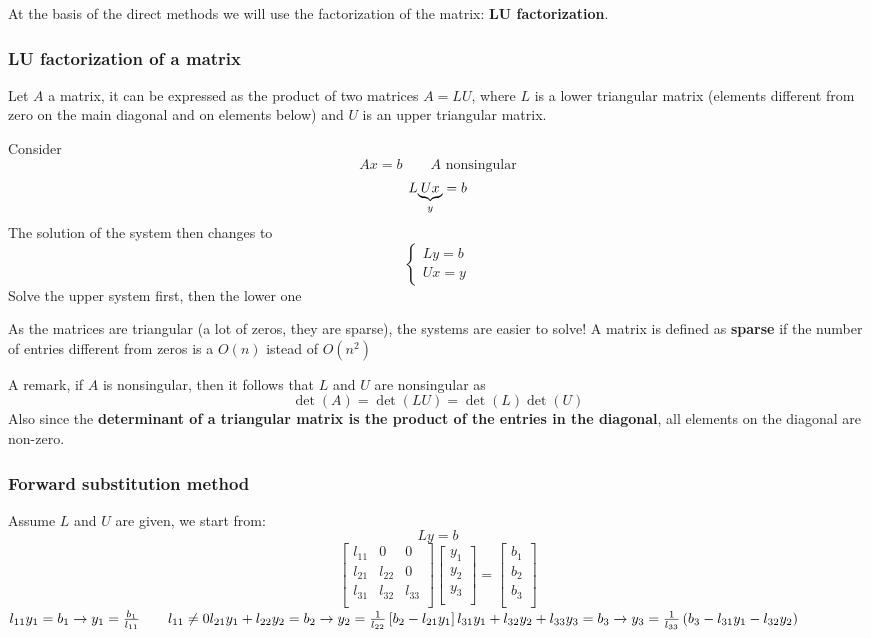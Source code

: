 At the basis of the direct methods we will use the factorization of the matrix: \textbf{LU factorization}.

\subsubsection{LU factorization of a matrix}
Let $A$ a matrix, it can be expressed as the product of two matrices $A=LU$, where $L$ is a lower triangular matrix (elements different from zero on the main diagonal and on elements below) and $U$ is an upper triangular matrix.

Consider
$$
Ax=b\qquad A\text{ nonsingular}
$$
$$
L\underlabel{Ux}{$y$}=b
$$
The solution of the system then changes to
$$
\begin{cases}
    Ly=b\\
    Ux=y
\end{cases}
$$
Solve the upper system first, then the lower one

As the matrices are triangular (a lot of zeros, they are sparse), the systems are easier to solve! A matrix is defined as \textbf{sparse} if the number of entries different from zeros is a $O(n)$ istead of $O(n^2)$

A remark, if $A$ is nonsingular, then it follows that $L$ and $U$ are nonsingular as
$$\det(A)=\det(LU)=\det(L)\det(U)$$
Also since the \textbf{determinant of a triangular matrix is the product of the entries in the diagonal}, all elements on the diagonal are non-zero.

\subsubsection{Forward substitution method}
Assume $L$ and $U$ are given, we start from:
$$Ly=b$$
$$
\begin{bmatrix}
    l_{11} & 0 & 0\\
    l_{21} & l_{22} & 0\\
    l_{31} & l_{32} & l_{33}\\
\end{bmatrix}
\begin{bmatrix}
    y_1\\
    y_2\\
    y_3\\
\end{bmatrix}=
\begin{bmatrix}
    b_1\\
    b_2\\
    b_3\\
\end{bmatrix}
$$
$
l_{11}y_1=b_1\rightarrow y_1=\frac{b_1}{l_{11}}\qquad l_{11}\neq0\\
\\
l_{21}y_1+l_{22}y_2=b_2\rightarrow y_2=\frac{1}{l_{22}}\left[b_2-l_{21}y_1\right]\\
\\
l_{31}y_1+l_{32}y_2+l_{33}y_3=b_3\rightarrow y_3=\frac{1}{l_{33}}\left(b_3-l_{31}y_1-l_{32}y_2\right)
$

